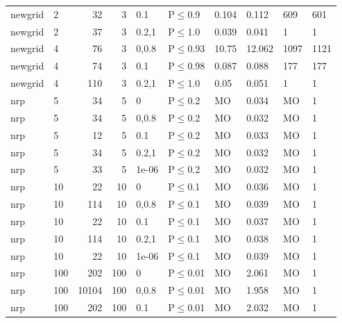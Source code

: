 \begin{longtable}{llrrllllll}
 newgrid       & 2        &     	32 &   3 & 0.1   & P$\leq$0.9   & 0.104   & 0.112   & 609     & 601    \\
 newgrid       & 2        &     	37 &   3 & 0.2,1 & P$\leq$1.0   & 0.039   & 0.041   & 1       & 1      \\
 newgrid       & 4        &     	76 &   3 & 0,0.8 & P$\leq$0.93  & 10.75   & 12.062  & 1097    & 1121   \\
 newgrid       & 4        &     	74 &   3 & 0.1   & P$\leq$0.98  & 0.087   & 0.088   & 177     & 177    \\
 newgrid       & 4        &    	110 &   3 & 0.2,1 & P$\leq$1.0   & 0.05    & 0.051   & 1       & 1      \\
 nrp           & 5        &     	34 &   5 & 0     & P$\leq$0.2   & MO      & 0.034   & MO      & 1      \\
 nrp           & 5        &     	34 &   5 & 0,0.8 & P$\leq$0.2   & MO      & 0.032   & MO      & 1      \\
 nrp           & 5        &     	12 &   5 & 0.1   & P$\leq$0.2   & MO      & 0.033   & MO      & 1      \\
 nrp           & 5        &     	34 &   5 & 0.2,1 & P$\leq$0.2   & MO      & 0.032   & MO      & 1      \\
 nrp           & 5        &     	33 &   5 & 1e-06 & P$\leq$0.2   & MO      & 0.032   & MO      & 1      \\
 nrp           & 10       &     	22 &  10 & 0     & P$\leq$0.1   & MO      & 0.036   & MO      & 1      \\
 nrp           & 10       &    	114 &  10 & 0,0.8 & P$\leq$0.1   & MO      & 0.039   & MO      & 1      \\
 nrp           & 10       &     	22 &  10 & 0.1   & P$\leq$0.1   & MO      & 0.037   & MO      & 1      \\
 nrp           & 10       &    	114 &  10 & 0.2,1 & P$\leq$0.1   & MO      & 0.038   & MO      & 1      \\
 nrp           & 10       &     	22 &  10 & 1e-06 & P$\leq$0.1   & MO      & 0.039   & MO      & 1      \\
 nrp           & 100      &    	202 & 100 & 0     & P$\leq$0.01  & MO      & 2.061   & MO      & 1      \\
 nrp           & 100      &  	10104 & 100 & 0,0.8 & P$\leq$0.01  & MO      & 1.958   & MO      & 1      \\
 nrp           & 100      &    	202 & 100 & 0.1   & P$\leq$0.01  & MO      & 2.032   & MO      & 1      \\

\end{longtable}
